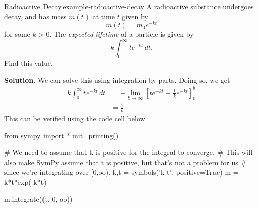 \documentclass[10pt,]{book}
\numberwithin{equation}{section}
\newcommand{\gt}{>}
\begin{document}
\begin{example}{Radioactive Decay.}{example-radioactive-decay}%
\hypertarget{p-592}{}%
A radioactive substance undergoes decay, and has mass \(m(t)\) at time \(t\) given by%
\begin{equation*}
m(t) = m_{0}e^{-kt}
\end{equation*}
for some \(k\gt0\). The \emph{expected lifetime} of a particle is given by%
\begin{equation*}
k\int_{0}^{\infty}te^{-kt}\,dt.
\end{equation*}
Find this value.%
\par\smallskip%
\noindent\textbf{Solution}.\hypertarget{solution-128}{}\quad%
\hypertarget{p-593}{}%
We can solve this using integration by parts. Doing so, we get%
\begin{align*}
k\int_{0}^{\infty}te^{-kt}\,dt & = -\lim_{b\to\infty}\left[te^{-kt} + \frac{1}{k}e^{-kt}\right]_{0}^{b} \\
& = \frac{1}{k} 
\end{align*}
This can be verified using the code cell below.%
\end{example}
\begin{sageinput}
from sympy import *
init_printing()

# We need to assume that k is positive for the integral to converge.
# This will also make SymPy assume that t is positive, but that's not a problem for us
# since we're integrating over [0,oo).
k,t = symbols('k t', positive=True)
m = k*t*exp(-k*t)

m.integrate((t, 0, oo))
\end{sageinput}
%
%
\typeout{************************************************}
\typeout{************************************************}
%
\end{document}
